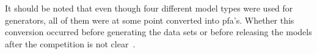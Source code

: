 It should be noted that even though four different model types were used for generators, all of them were at some point converted into \gls{pfa}'s. Whether this conversion occurred before generating the data sets or before releasing the models after the competition is not clear~\cite{pautomac_results}.